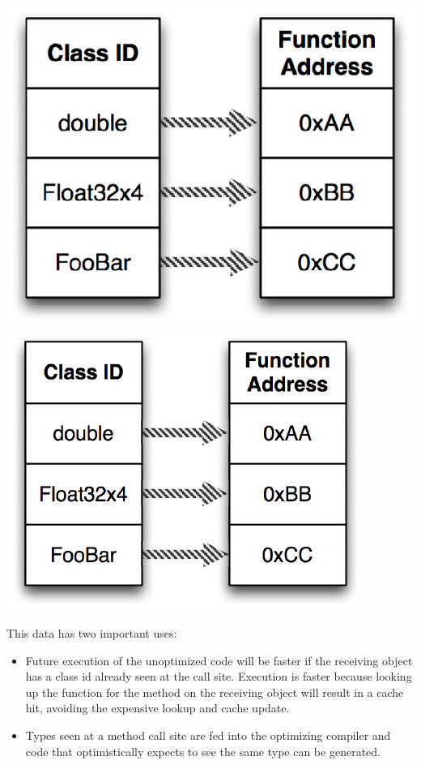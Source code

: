 \documentclass[preprint]{sigplanconf}
\begin{document}
\ifx\pdfoutput\undefined
\includegraphics{figures/typecache.eps}
\else
\includegraphics{figures/typecache-eps-converted-to.pdf}
\fi

This data has two important uses:
\begin{itemize}
\item
Future execution of the unoptimized code will be faster if the receiving object
has a class id already seen at the call site. Execution is faster because
looking up the function for the method on the receiving object will result in a
cache hit, avoiding the expensive lookup and cache update.

\item
Types seen at a method call site are fed into the optimizing compiler and code
that optimistically expects to see the same type can be generated.
\end{itemize}
\end{document}

